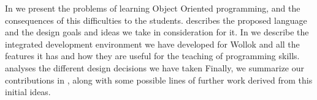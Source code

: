 
\medskip


\medskip 
In  we present the problems of learning Object Oriented programming, and the consequences of this difficulties to the students.  describes the proposed language and the design goals and ideas we take in consideration for it. In  we describe the integrated development environment we have developed for Wollok and all the features it has and how they are useful for the teaching of programming skills.  analyses the different design decisions we have taken
Finally, we summarize our contributions in ,
along with some possible lines of further work derived from this initial ideas. 


